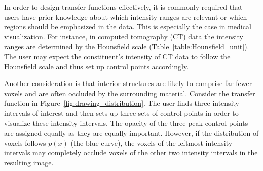 \documentclass{egpubl}
\begin{document}
In order to design transfer functions effectively, it is commonly required that users have prior knowledge about which intensity ranges are relevant or which regions should be emphasized in the data. This is especially the case in medical visualization. For instance, in computed tomography (CT) data the intensity ranges are determined by the Hounsfield scale (Table~\ref{table:Hounsfield_unit}). The user may expect the constituent's intensity of CT data to follow the Hounsfield scale and thus set up control points accordingly.

Another consideration is that interior structures are likely to comprise far fewer voxels and are often occluded by the surrounding material.
Consider the transfer function in Figure~\ref{fig:drawing_distribution}. The user finds three intensity intervals of interest and then sets up three sets of control points in order to visualize these intensity intervals. The opacity of the three peak control points are assigned equally as they are equally important.
However, if the distribution of voxels follows $ p(x) $ (the blue curve), the voxels of the leftmost intensity intervals may completely occlude voxels of the other two intensity intervals in the resulting image.
\end{document}

